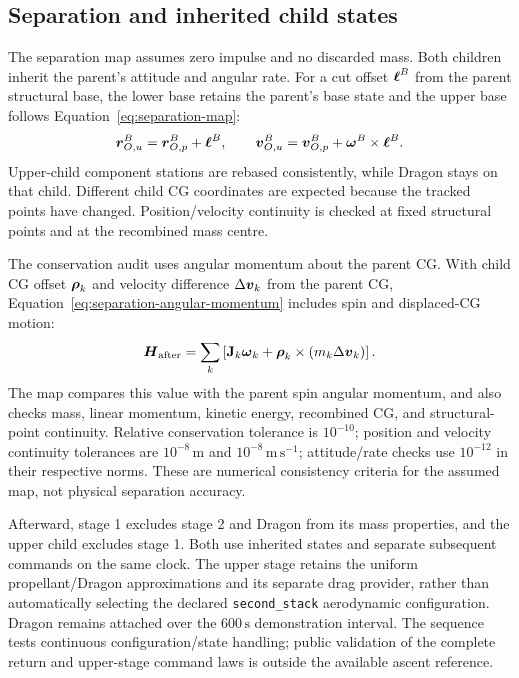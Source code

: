 \subsection{Separation and inherited child states}
The separation map assumes zero impulse and no discarded mass. Both children inherit the parent's attitude and angular rate. For a cut offset $\boldsymbol{\ell}^B$ from the parent structural base, the lower base retains the parent's base state and the upper base follows Equation~\eqref{eq:separation-map}:
\begin{equation}
 \boldsymbol{r}_{O,u}^B=\boldsymbol{r}_{O,p}^B+\boldsymbol{\ell}^B,\qquad
 \boldsymbol{v}_{O,u}^B=\boldsymbol{v}_{O,p}^B+\boldsymbol{\omega}^B\times\boldsymbol{\ell}^B.
\label{eq:separation-map}
\end{equation}
Upper-child component stations are rebased consistently, while Dragon stays on that child. Different child CG coordinates are expected because the tracked points have changed. Position/velocity continuity is checked at fixed structural points and at the recombined mass centre.

The conservation audit uses angular momentum about the parent CG. With child CG offset $\boldsymbol{\rho}_k$ and velocity difference $\Delta\boldsymbol{v}_k$ from the parent CG, Equation~\eqref{eq:separation-angular-momentum} includes spin and displaced-CG motion:
\begin{equation}
 \boldsymbol{H}_{\mathrm{after}}=\sum_k\left[\mathbf{J}_k\boldsymbol{\omega}_k+
 \boldsymbol{\rho}_k\times(m_k\Delta\boldsymbol{v}_k)\right].
\label{eq:separation-angular-momentum}
\end{equation}
The map compares this value with the parent spin angular momentum, and also checks mass, linear momentum, kinetic energy, recombined CG, and structural-point continuity. Relative conservation tolerance is $10^{-10}$; position and velocity continuity tolerances are $10^{-8}\,\mathrm{m}$ and $10^{-8}\,\mathrm{m\,s^{-1}}$; attitude/rate checks use $10^{-12}$ in their respective norms. These are numerical consistency criteria for the assumed map, not physical separation accuracy.

Afterward, stage 1 excludes stage 2 and Dragon from its mass properties, and the upper child excludes stage 1. Both use inherited states and separate subsequent commands on the same clock. The upper stage retains the uniform propellant/Dragon approximations and its separate drag provider, rather than automatically selecting the declared \texttt{second\_stack} aerodynamic configuration. Dragon remains attached over the $600\,\mathrm{s}$ demonstration interval. The sequence tests continuous configuration/state handling; public validation of the complete return and upper-stage command laws is outside the available ascent reference.
